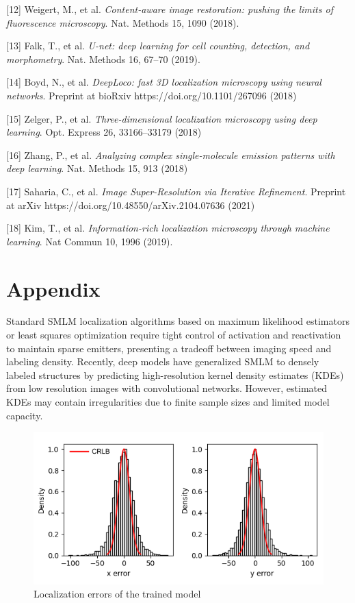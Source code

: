 \documentclass{article}
\begin{document}
{[12] Weigert, M., et al. {\it Content-aware image restoration: pushing the limits of fluorescence microscopy}. Nat. Methods 15, 1090 (2018).

[13] Falk, T., et al. {\it U-net: deep learning for cell counting, detection, and morphometry}. Nat. Methods 16, 67–70 (2019).

[14] Boyd, N., et al. {\it DeepLoco: fast 3D localization microscopy using neural networks}. Preprint at bioRxiv https://doi.org/10.1101/267096 (2018)

[15] Zelger, P., et al. {\it Three-dimensional localization microscopy using deep learning}. Opt. Express 26, 33166–33179 (2018)

[16] Zhang, P., et al. {\it Analyzing complex single-molecule emission patterns with deep learning}. Nat. Methods 15, 913 (2018)

[17] Saharia, C., et al. {\it Image Super-Resolution via Iterative Refinement}. Preprint at arXiv https://doi.org/10.48550/arXiv.2104.07636 (2021)

[18] Kim, T., et al. {\it Information-rich localization microscopy through machine learning}. Nat Commun 10, 1996 (2019). 

}

\appendix

\section{Appendix}

Standard SMLM localization algorithms based on maximum likelihood estimators or least squares optimization require tight control of activation and reactivation to maintain sparse emitters, presenting a tradeoff between imaging speed and labeling density. Recently, deep models have generalized SMLM to densely labeled structures by predicting high-resolution kernel density estimates (KDEs) from low resolution images with convolutional networks. However, estimated KDEs may contain irregularities due to finite sample sizes and limited model capacity. 

\begin{figure}
\centering
\includegraphics[scale=0.7]{Errors.png}
\caption{Localization errors of the trained model}
\end{figure}
\end{document}
